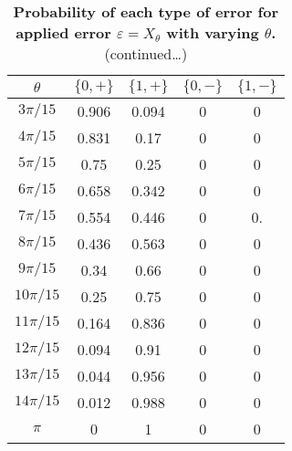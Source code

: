 \documentclass[superscriptaddress,twocolumn,showpacs,prb]{revtex4-1}
\begin{document}
\begin{table}[h!]
\begin{center}
 \begin{tabular}{c c c c c} 
 \hline
 \hline
 $\theta$ & $\{0 , +\}$ & $\{1 , +\}$&$\{0 , -\}$&$\{1 , -\}$ \\ [0.5ex] 
 \hline
 \hline
 $3\pi/15$ &0.906 &0.094 &0&0   \\ 
 \hline
 $4\pi/15$ &0.831 &0.17&0&0  \\
 \hline
 $5\pi/15$ & 0.75&0.25&0&0\\
 \hline
 $6\pi/15$ & 0.658&0.342&0&0   \\  
\hline
 $7\pi/15$ & 0.554&0.446&0&0.   \\ 
 \hline
 $8\pi/15$ & 0.436&0.563&0&0 \\
 \hline
  $9\pi/15$&0.34&0.66&0&0\\
  \hline
  $10\pi/15$&0.25&0.75&0&0\\
  \hline
  $11\pi/15$&0.164&0.836&0&0\\
  \hline
   $12\pi/15$&0.094&0.91&0&0\\
  \hline
  $13\pi/15$&0.044&0.956&0&0\\
  \hline
  $14\pi/15$&0.012&0.988&0&0\\
  \hline
  $\pi$&0&1&0&0\\[1ex]
  \hline
 \hline
\end{tabular}
\caption{\textbf{Probability of each type of error for applied error $\varepsilon=X_{\theta}$ with varying $\theta$.} (continued\dots)}
\label{qed_table3}
\end{center}
\end{table}
\end{document}
